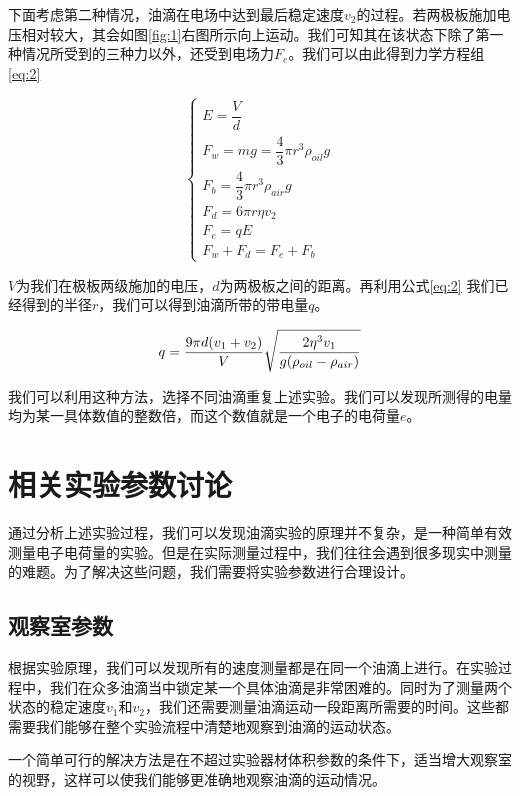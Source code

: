 \documentclass[paper=a4, fontsize=11pt]{scrartcl} %
\numberwithin{equation}{section} %
\numberwithin{figure}{section} %
\numberwithin{table}{section} %
\begin{document}
下面考虑第二种情况，油滴在电场中达到最后稳定速度$v_2$的过程。若两极板施加电压相对较大，其会如图\ref{fig:1}右图所示向上运动。我们可知其在该状态下除了第一种情况所受到的三种力以外，还受到电场力$F_e$。我们可以由此得到力学方程组\eqref{eq:2}

\begin{equation}
	\begin{cases}
		E = \dfrac{V}{d}\\
		F_w = mg = \dfrac{4}{3}\pi r^3 \rho_{oil}g\\
		F_b = \dfrac{4}{3}\pi r^3 \rho_{air} g\\
		F_d = 6\pi r \eta v_2\\
		F_e = qE\\
		F_w+F_d=F_e+F_b
	\end{cases}
	\label{eq:2}
\end{equation}

$V$为我们在极板两级施加的电压，$d$为两极板之间的距离。再利用公式\eqref{eq:2} 我们已经得到的半径$r$，我们可以得到油滴所带的带电量$q$。

\begin{equation}
	\centering
	q=\dfrac{9\pi d(v_1+v_2)}{V}\sqrt{\dfrac{2\eta^3 v_1}{g(\rho_{oil}-\rho_{air})}}
	\label{eq:3}
\end{equation}

我们可以利用这种方法，选择不同油滴重复上述实验。我们可以发现所测得的电量均为某一具体数值的整数倍，而这个数值就是一个电子的电荷量$e$。

\section{\kaishu 相关实验参数讨论}

通过分析上述实验过程，我们可以发现油滴实验的原理并不复杂，是一种简单有效测量电子电荷量的实验。但是在实际测量过程中，我们往往会遇到很多现实中测量的难题。为了解决这些问题，我们需要将实验参数进行合理设计。

\subsection{\kaishu 观察室参数}
根据实验原理，我们可以发现所有的速度测量都是在同一个油滴上进行。在实验过程中，我们在众多油滴当中锁定某一个具体油滴是非常困难的。同时为了测量两个状态的稳定速度$v_1$和$v_2$，我们还需要测量油滴运动一段距离所需要的时间。这些都需要我们能够在整个实验流程中清楚地观察到油滴的运动状态。

一个简单可行的解决方法是在不超过实验器材体积参数的条件下，适当增大观察室的视野，这样可以使我们能够更准确地观察油滴的运动情况。
\end{document}
